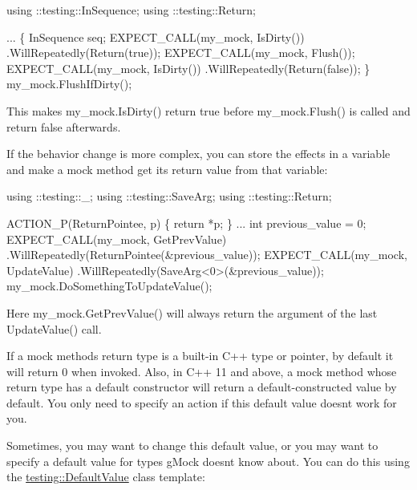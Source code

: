 \begin{DoxyCode}
using ::testing::InSequence;
using ::testing::Return;

...
  \{
     InSequence seq;
     EXPECT\_CALL(my\_mock, IsDirty())
         .WillRepeatedly(Return(\textcolor{keyword}{true}));
     EXPECT\_CALL(my\_mock, Flush());
     EXPECT\_CALL(my\_mock, IsDirty())
         .WillRepeatedly(Return(\textcolor{keyword}{false}));
  \}
  my\_mock.FlushIfDirty();
\end{DoxyCode}


This makes {\ttfamily my\+\_\+mock.\+Is\+Dirty()} return {\ttfamily true} before {\ttfamily my\+\_\+mock.\+Flush()} is called and return {\ttfamily false} afterwards.

If the behavior change is more complex, you can store the effects in a variable and make a mock method get its return value from that variable\+:


\begin{DoxyCode}
using ::testing::\_;
using ::testing::SaveArg;
using ::testing::Return;

ACTION\_P(ReturnPointee, p) \{ \textcolor{keywordflow}{return} *p; \}
...
  \textcolor{keywordtype}{int} previous\_value = 0;
  EXPECT\_CALL(my\_mock, GetPrevValue)
      .WillRepeatedly(ReturnPointee(&previous\_value));
  EXPECT\_CALL(my\_mock, UpdateValue)
      .WillRepeatedly(SaveArg<0>(&previous\_value));
  my\_mock.DoSomethingToUpdateValue();
\end{DoxyCode}


Here {\ttfamily my\+\_\+mock.\+Get\+Prev\+Value()} will always return the argument of the last {\ttfamily Update\+Value()} call.

If a mock method\textquotesingle{}s return type is a built-\/in C++ type or pointer, by default it will return 0 when invoked. Also, in C++ 11 and above, a mock method whose return type has a default constructor will return a default-\/constructed value by default. You only need to specify an action if this default value doesn\textquotesingle{}t work for you.

Sometimes, you may want to change this default value, or you may want to specify a default value for types g\+Mock doesn\textquotesingle{}t know about. You can do this using the {\ttfamily \mbox{\hyperlink{classtesting_1_1DefaultValue}{testing\+::\+Default\+Value}}} class template\+:


